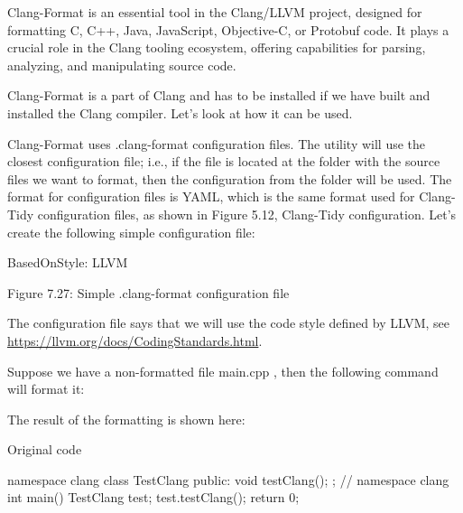 Clang-Format is an essential tool in the Clang/LLVM project, designed for formatting C, C++, Java, JavaScript, Objective-C, or Protobuf code. It plays a crucial role in the Clang tooling ecosystem, offering capabilities for parsing, analyzing, and manipulating source code.

Clang-Format is a part of Clang and has to be installed if we have built and installed the Clang compiler. Let's look at how it can be used.


Clang-Format uses .clang-format configuration files. The utility will use the closest configuration file; i.e., if the file is located at the folder with the source files we want to format, then the configuration from the folder will be used. The format for configuration files is YAML, which is the same format used for Clang-Tidy configuration files, as shown in Figure 5.12, Clang-Tidy configuration. Let's create the following simple configuration file:

\begin{shell}
BasedOnStyle: LLVM
\end{shell}

\begin{center}
Figure 7.27: Simple .clang-format configuration file
\end{center}

The configuration file says that we will use the code style defined by LLVM, see \url{https://llvm.org/docs/CodingStandards.html}.

Suppose we have a non-formatted file main.cpp , then the following command will format it:


The result of the formatting is shown here:

\begin{cpp}
namespace clang {
class TestClang {
public:
  void testClang(){};
};
int main() {
  TestClang test;
  test.testClang();
  return 0;
}
\end{cpp}

Original code

\begin{cpp}
namespace clang {
class TestClang {
public:
  void testClang(){};
};
} // namespace clang
int main() {
  TestClang test;
  test.testClang();
  return 0;
}
\end{cpp}

